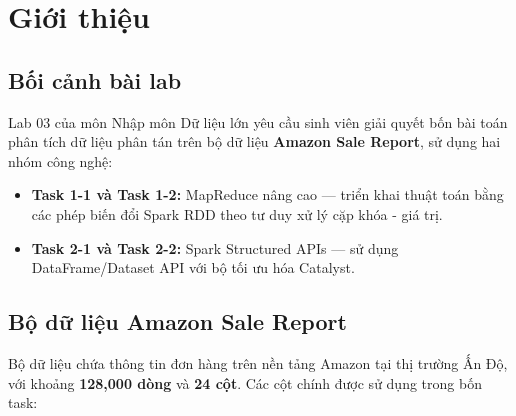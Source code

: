 \section{Giới thiệu}

\subsection{Bối cảnh bài lab}

Lab 03 của môn Nhập môn Dữ liệu lớn yêu cầu sinh viên giải quyết bốn bài toán phân tích dữ liệu phân tán trên bộ dữ liệu \textbf{Amazon Sale Report}, sử dụng hai nhóm công nghệ:

\begin{itemize}
    \item \textbf{Task 1-1 và Task 1-2:} MapReduce nâng cao --- triển khai thuật toán bằng các phép biến đổi Spark RDD theo tư duy xử lý cặp khóa - giá trị.
    \item \textbf{Task 2-1 và Task 2-2:} Spark Structured APIs --- sử dụng DataFrame/Dataset API với bộ tối ưu hóa Catalyst.
\end{itemize}

\subsection{Bộ dữ liệu Amazon Sale Report}

Bộ dữ liệu chứa thông tin đơn hàng trên nền tảng Amazon tại thị trường Ấn Độ, với khoảng \textbf{128,000 dòng} và \textbf{24 cột}. Các cột chính được sử dụng trong bốn task:

